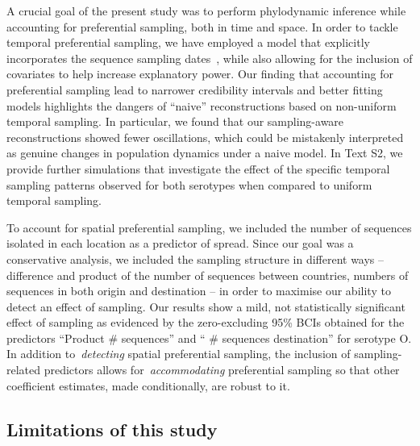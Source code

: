 \documentclass[10pt]{article}
\begin{document}
A crucial goal of the present study was to perform phylodynamic inference while accounting for preferential sampling, both in time and space.
In order to tackle temporal preferential sampling, we have employed a model that explicitly incorporates the sequence sampling dates~\citep{Karcher2019}, while also allowing for the inclusion of covariates to help increase explanatory power.
Our finding that accounting for preferential sampling lead to narrower credibility intervals and better fitting models highlights the dangers of ``naive'' reconstructions based on non-uniform temporal sampling.
In particular, we found that our sampling-aware reconstructions showed fewer oscillations, which could be mistakenly interpreted as genuine changes in population dynamics under a naive model. 
In Text S2, we provide further simulations that investigate the effect of the specific temporal sampling patterns observed for both serotypes when compared to uniform temporal sampling.

To account for spatial preferential sampling, we included the number of sequences isolated in each location as a predictor of spread. 
Since our goal was a conservative analysis, we included the sampling structure in different ways -- difference and product of the number of sequences between countries, numbers of sequences in both origin and destination -- in order to maximise our ability to detect an effect of sampling.
Our results show a mild, not statistically significant effect of sampling as evidenced by the zero-excluding 95\% BCIs obtained for the predictors ``Product \# sequences'' and `` \# sequences destination'' for serotype O.
In addition to~\textit{detecting} spatial preferential sampling, the inclusion of sampling-related predictors allows for~\textit{accommodating} preferential sampling so that other coefficient estimates, made conditionally, are robust to it. 

\subsection*{Limitations of this study}
\end{document}
